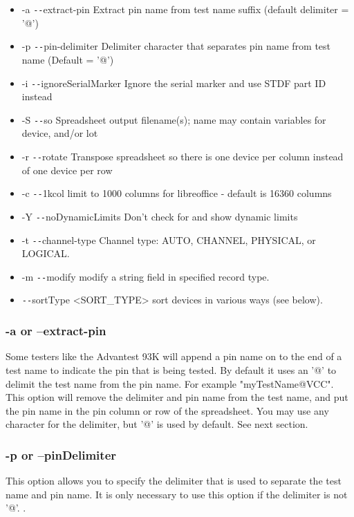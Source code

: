 \documentclass[letterpaper]{article}
\begin{document}
\begin{itemize}
\item -a        \texttt{-{}-}extract-pin Extract pin name from test name suffix (default delimiter = '@')
\item -p      \texttt{-{}-}pin-delimiter Delimiter character that separates pin name from test name (Default = '@')
\item -i \texttt{-{}-}ignoreSerialMarker Ignore the serial marker and use STDF part ID instead
\item -S                 \texttt{-{}-}so Spreadsheet output filename(s); name may contain variables for device, and/or lot
\item -r             \texttt{-{}-}rotate Transpose spreadsheet so there is one device per column instead of one device per row
\item -c              \texttt{-{}-}1kcol limit to 1000 columns for libreoffice - default is 16360 columns
\item -Y    \texttt{-{}-}noDynamicLimits Don't check for and show dynamic limits
\item -t       \texttt{-{}-}channel-type Channel type: AUTO, CHANNEL, PHYSICAL, or LOGICAL.
\item -m             \texttt{-{}-}modify modify a string field in specified record type.
\item \texttt{-{}-}sortType <SORT\_TYPE> sort devices in various ways (see below).
\end{itemize}

\subsubsection{\bf -a or --extract-pin}
Some testers like the Advantest 93K will append a pin name on to the end of a test name
to indicate the pin that is being tested.  By default it uses an \makeatletter '@' \makeatother
to delimit the test name from the pin name.  For example \makeatletter "myTestName@VCC". \makeatother
This option will remove the delimiter and pin name from the test name, and put the pin name
in the pin column or row of the spreadsheet.  You may use any character for the delimiter,
but \makeatletter '@' \makeatother is used by default.  See next section.

\subsubsection{\bf -p or --pinDelimiter}
This option allows you to specify the delimiter that is used to separate the test name and pin name.
It is only necessary to use this option if the delimiter is not \makeatletter '@'. \makeatother.
\clearpage
\end{document}
